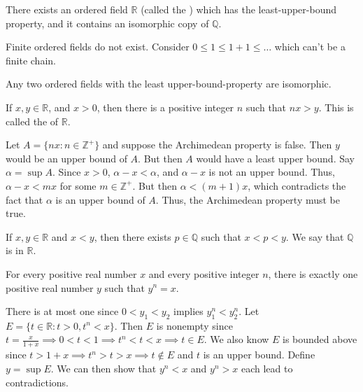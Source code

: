 \documentclass[11pt,letterpaper]{jacky}
\begin{document}
\begin{defi}
  There exists an ordered field $\mathbb{R}$ (called the )
  which has the least-upper-bound property, and it contains an isomorphic copy
  of $\mathbb{Q}$.
\end{defi}

Finite ordered fields do not exist. Consider $0\leq1\leq1+1\leq\ldots$ which
can't be a finite chain.

Any two ordered fields with the least upper-bound-property are isomorphic.

\begin{thm}
  If $x,y\in\mathbb{R}$, and $x>0$, then there is a positive integer $n$ such
  that $nx>y$. This is called the  of
  $\mathbb{R}$.
\end{thm}

\begin{pf}
  Let $A=\{nx:n\in\mathbb{Z}^+\}$ and suppose the Archimedean property is
  false. Then $y$ would be an upper bound of $A$. But then $A$ would have a
  least upper bound. Say $\alpha=\sup A$. Since $x>0$, $\alpha-x<\alpha$, and
  $\alpha-x$ is not an upper bound. Thus, $\alpha-x<mx$ for some
  $m\in\mathbb{Z}^+$. But then $\alpha<(m+1)x$, which contradicts the fact that
  $\alpha$ is an upper bound of $A$. Thus, the Archimedean property must be
  true.
\end{pf}

\begin{thm}
  If $x,y\in\mathbb{R}$ and $x<y$, then there exists $p\in\mathbb{Q}$ such that
  $x<p<y$. We say that $\mathbb{Q}$ is  in $\mathbb{R}$.
\end{thm}

\begin{thm}
  For every positive real number $x$ and every positive integer $n$, there is
  exactly one positive real number $y$ such that $y^n=x$.
\end{thm}

\begin{pf}
  There is at most one since $0<y_1<y_2$ implies $y_1^n<y_2^n$. Let
  $E=\{t\in\mathbb{R}:t>0,t^n<x\}$. Then $E$ is nonempty since
  $t=\frac{x}{1+x}\implies0<t<1\implies t^n<t<x\implies t\in E$. We also know
  $E$ is bounded above since $t>1+x\implies t^n>t>x\implies t\notin E$ and $t$
  is an upper bound. Define $y=\sup E$. We can then show that $y^n<x$ and
  $y^n>x$ each lead to contradictions.
\end{pf}
\end{document}
